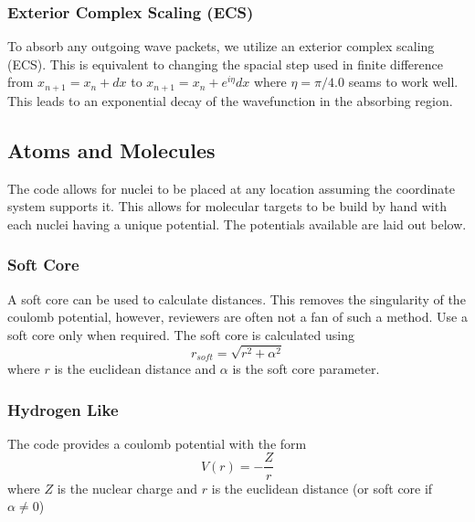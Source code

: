 \documentclass{article}
\begin{document}
\subsubsection{Exterior Complex Scaling (ECS)} %
\label{ssub:exterer_complex_scaling}
To absorb any outgoing wave packets, we utilize an exterior complex scaling (ECS). This is equivalent to changing the spacial step used in finite difference from $x_{n+1} = x_n+dx$ to $x_{n+1} = x_n+e^{i\eta}dx$ where $\eta=\pi / 4.0$ seams to work well. This leads to an exponential decay of the wavefunction in the absorbing region.


\subsection{Atoms and Molecules} %
\label{sub:atoms_and_molecules}
The code allows for nuclei to be placed at any location assuming the coordinate system supports it. This allows for molecular targets to be build by hand with each nuclei having a unique potential. The potentials available are laid out below.

\subsubsection{Soft Core} %
\label{ssub:soft_core_like}
A soft core can be used to calculate distances. This removes the singularity of the coulomb potential, however, reviewers are often not a fan of such a method. Use a soft core only when required. The soft core is calculated using
\begin{equation}
  r_{soft} = \sqrt{r^2 + \alpha^2}
\end{equation}
where $r$ is the euclidean distance and $\alpha$ is the soft core parameter.

\subsubsection{Hydrogen Like} %
\label{ssub:hydrogen_like}
The code provides a coulomb potential with the form
\begin{equation}
  V(r) = -\frac{Z}{r}
\end{equation}
where $Z$ is the nuclear charge and $r$ is the euclidean distance (or soft core if $\alpha \ne 0$)
\end{document}
